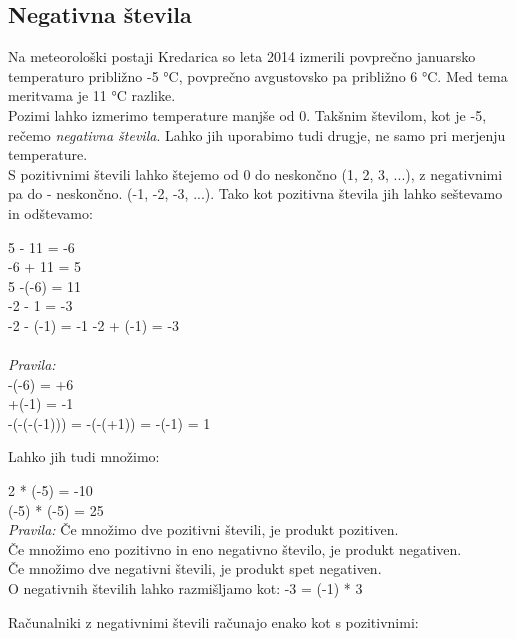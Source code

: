 \documentclass{article}
\begin{document}
\subsection*{Negativna števila}
Na meteorološki postaji Kredarica so leta 2014 izmerili povprečno januarsko temperaturo približno -5 °C, povprečno avgustovsko pa približno 6 °C.
Med tema meritvama je 11 °C razlike. \\
Pozimi lahko izmerimo temperature manjše od 0. Takšnim številom, kot je -5, rečemo \emph{negativna števila}. Lahko jih uporabimo tudi drugje, ne samo pri merjenju temperature. \\
S pozitivnimi števili lahko štejemo od 0 do neskončno (1, 2, 3, ...), z negativnimi pa do - neskončno. (-1, -2, -3, ...). Tako kot pozitivna števila jih lahko seštevamo in odštevamo:

\begin{examples}
5 - 11 = -6 \\
-6 + 11 = 5 \\
5 -(-6) = 11 \\
-2 - 1 = -3 \\ 
-2 - (-1) = -1
-2 + (-1) = -3 \\\\
\emph{Pravila:}\\
-(-6) = +6\\
+(-1) = -1 \\
-(-(-(-1))) = -(-(+1)) = -(-1) = 1
\end{examples}

Lahko jih tudi množimo:

\begin{examples}
2 * (-5) = -10 \\
(-5) * (-5) = 25 \\

\emph{Pravila:}
Če množimo dve pozitivni števili, je produkt pozitiven. \\
Če množimo eno pozitivno in eno negativno število, je produkt negativen. \\
Če množimo dve negativni števili, je produkt spet negativen. \\
O negativnih številih lahko razmišljamo kot: -3 = (-1) * 3
\end{examples}

Računalniki z negativnimi števili računajo enako kot s pozitivnimi:
\end{document}
